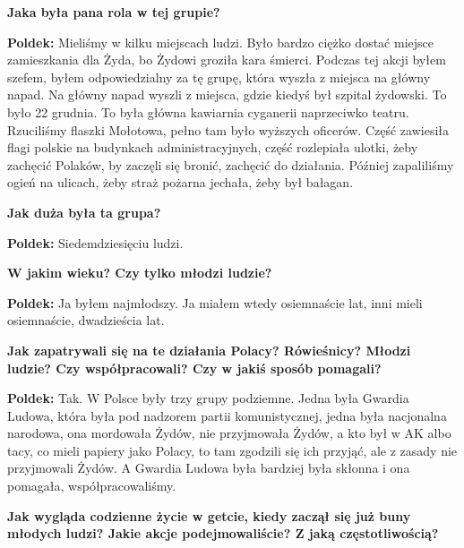 \textbf{Jaka była pana rola w tej grupie?}\par 
\textbf{Poldek:} Mieliśmy w kilku miejscach ludzi. Było bardzo ciężko dostać miejsce zamieszkania dla Żyda, bo Żydowi groziła kara śmierci. Podczas tej akcji byłem szefem, byłem odpowiedzialny za tę grupę, która wyszła z miejsca na główny napad. Na główny napad wyszli z miejsca, gdzie kiedyś był szpital żydowski. To było 22 grudnia. To była główna kawiarnia cyganerii naprzeciwko teatru. Rzuciliśmy flaszki Mołotowa, pełno tam było wyższych oficerów. Część zawiesiła flagi polskie na budynkach administracyjnych, część rozlepiała ulotki, żeby zachęcić Polaków, by zaczęli się bronić, zachęcić do działania. Później zapaliliśmy ogień na ulicach, żeby straż pożarna jechała, żeby był bałagan.\par  
\textbf{Jak duża była ta grupa?}\par
\textbf{Poldek:} Siedemdziesięciu ludzi.\par 
\textbf{W jakim wieku? Czy tylko młodzi ludzie?}\par  
\textbf{Poldek:} Ja byłem najmłodszy. Ja miałem wtedy osiemnaście lat, inni mieli osiemnaście, dwadzieścia lat.\par
\textbf{Jak zapatrywali się na te działania Polacy? Rówieśnicy? Młodzi ludzie? Czy współpracowali? Czy w jakiś sposób pomagali?}\par
\textbf{Poldek:} Tak. W Polsce były trzy grupy podziemne. Jedna była Gwardia Ludowa, która była pod nadzorem partii komunistycznej, jedna była nacjonalna narodowa, ona mordowała Żydów, nie przyjmowała Żydów, a kto był w AK albo tacy, co mieli papiery jako Polacy, to tam zgodzili się ich przyjąć, ale z zasady nie przyjmowali Żydów. A Gwardia Ludowa była bardziej była skłonna i ona pomagała, współpracowaliśmy.\par 
\textbf{Jak wygląda codzienne życie w getcie, kiedy zaczął się już buny młodych ludzi? Jakie akcje podejmowaliście? Z jaką częstotliwością?}\par   
